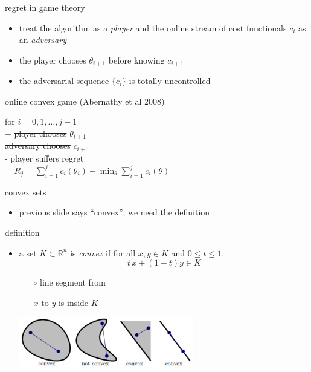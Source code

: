 \documentclass[xcolor={svgnames},
               hyperref={colorlinks,citecolor=DeepPink4,linkcolor=FireBrick,urlcolor=Maroon}]
               {beamer}
\newcommand{\RR}{\mathbb{R}}
\newcommand{\ds}{\displaystyle}
\begin{document}
\begin{frame}{regret in game theory}

\begin{itemize}
\item treat the algorithm as a \emph{player} and the online stream of cost functionals $c_i$ as an \emph{adversary}
\item the player chooses $\theta_{i+1}$ \alert{before} knowing $c_{i+1}$
\item the adversarial sequence $\{c_i\}$ is totally uncontrolled
\end{itemize}

\begin{block}{online convex game (Abernathy et al 2008)}
\begin{pseudo*}
for $i = 0,1,\dots,j-1$ \\+
    \st{player chooses} $\theta_{i+1}$ \\
    \st{adversary chooses} $c_{i+1}$ \\-
\st{player suffers regret} \\+
    $\ds R_j = \sum_{i=1}^j c_i(\theta_i) - \min_\theta \sum_{i=1}^j c_i(\theta)$
\end{pseudo*}
\end{block}
\end{frame}


\begin{frame}{convex sets}

\begin{itemize}
\item previous slide says ``convex''; we need the definition
\end{itemize}

\begin{block}{definition}
\begin{itemize}
\item a set $K \subset \RR^n$ is \emph{convex} if for all $x,y \in K$ and $0 \le t \le 1$,
  $$t\, x + (1-t) y \in K$$

    \begin{itemize}
    \item[$\circ$] line segment from
    \item[]  $x$ to $y$ is inside $K$
    \end{itemize}

\vspace{-8mm}
\hfill \includegraphics[width=0.6\textwidth]{figs/convex}
\end{itemize}
\end{block}
\end{frame}
\end{document}
